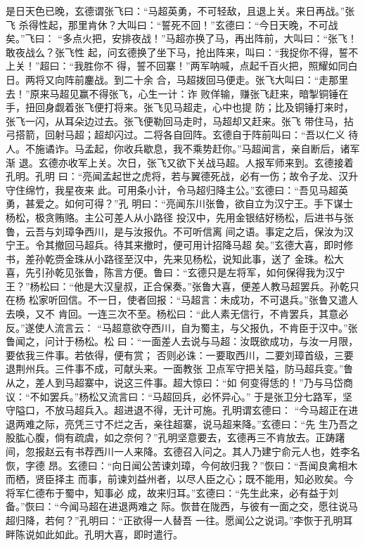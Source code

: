 是日天色已晚，玄德谓张飞曰：“马超英勇，不可轻敌，且退上关。来日再战。”张飞
杀得性起，那里肯休？大叫曰：“誓死不回！”玄德曰：“今日天晚，不可战矣。”飞曰：
“多点火把，安排夜战！”马超亦换了马，再出阵前，大叫曰：“张飞！敢夜战么？张飞性
起，问玄德换了坐下马，抢出阵来，叫曰：“我捉你不得，誓不上关！”超曰：“我胜你不
得，誓不回寨！”两军呐喊，点起千百火把，照耀如同白日。两将又向阵前鏖战。到二十余
合，马超拨回马便走。张飞大叫曰：“走那里去！”原来马超见赢不得张飞，心生一计：诈
败佯输，赚张飞赶来，暗掣铜锤在手，扭回身觑着张飞便打将来。张飞见马超走，心中也提
防；比及铜锤打来时，张飞一闪，从耳朵边过去。张飞便勒回马走时，马超却又赶来。张飞
带住马，拈弓搭箭，回射马超；超却闪过。二将各自回阵。玄德自于阵前叫曰：“吾以仁义
待人。不施谲诈。马孟起，你收兵歇息，我不乘势赶你。”马超闻言，亲自断后，诸军渐
退。玄德亦收军上关。次日，张飞又欲下关战马超。人报军师来到。玄德接着孔明。孔明
曰：“亮闻孟起世之虎将，若与翼德死战，必有一伤；故令子龙、汉升守住绵竹，我星夜来
此。可用条小计，令马超归降主公。”玄德曰：“吾见马超英勇，甚爱之。如何可得？”孔
明曰：“亮闻东川张鲁，欲自立为汉宁王。手下谋士杨松，极贪贿赂。主公可差人从小路径
投汉中，先用金银结好杨松，后进书与张鲁，云吾与刘璋争西川，是与汝报仇。不可听信离
间之语。事定之后，保汝为汉宁王。令其撤回马超兵。待其来撤时，便可用计招降马超
矣。”玄德大喜，即时修书，差孙乾赍金珠从小路径至汉中，先来见杨松，说知此事，送了
金珠。松大喜，先引孙乾见张鲁，陈言方便。鲁曰：“玄德只是左将军，如何保得我为汉宁
王？”杨松曰：“他是大汉皇叔，正合保奏。”张鲁大喜，便差人教马超罢兵。孙乾只在杨
松家听回信。不一日，使者回报：“马超言：未成功，不可退兵。”张鲁又遣人去唤，又不
肯回。一连三次不至。杨松曰：“此人素无信行，不肯罢兵，其意必反。”遂使人流言云：
“马超意欲夺西川，自为蜀主，与父报仇，不肯臣于汉中。”张鲁闻之，问计于杨松。松
曰：“一面差人去说与马超：汝既欲成功，与汝一月限，要依我三件事。若依得，便有赏；
否则必诛：一要取西川，二要刘璋首级，三要退荆州兵。三件事不成，可献头来。一面教张
卫点军守把关隘，防马超兵变。”鲁从之，差人到马超寨中，说这三件事。超大惊曰：“如
何变得恁的！”乃与马岱商议：“不如罢兵。”杨松又流言曰：“马超回兵，必怀异心。”
于是张卫分七路军，坚守隘口，不放马超兵入。超进退不得，无计可施。孔明谓玄德曰：
“今马超正在进退两难之际，亮凭三寸不烂之舌，亲往超寨，说马超来降。”玄德曰：“先
生乃吾之股肱心腹，倘有疏虞，如之奈何？”孔明坚意要去，玄德再三不肯放去。正踌躇
间，忽报赵云有书荐西川一人来降。玄德召入问之。其人乃建宁俞元人也，姓李名恢，字德
昂。玄德曰：“向日闻公苦谏刘璋，今何故归我？”恢曰：“吾闻良禽相木而栖，贤臣择主
而事，前谏刘益州者，以尽人臣之心；既不能用，知必败矣。今将军仁德布于蜀中，知事必
成，故来归耳。”玄德曰：“先生此来，必有益于刘备。”恢曰：“今闻马超在进退两难之
际。恢昔在陇西，与彼有一面之交，愿往说马超归降，若何？”孔明曰：“正欲得一人替吾
一往。愿闻公之说词。”李恢于孔明耳畔陈说如此如此。孔明大喜，即时遣行。

